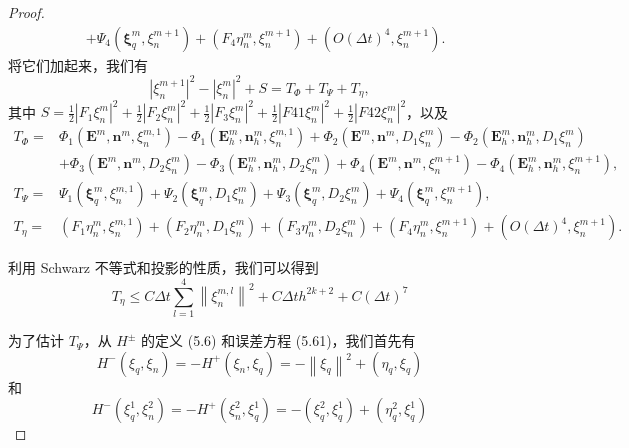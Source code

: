 \begin{proof}
\begin{align}
          & +\Psi_{4}\left(\boldsymbol{\xi}_{q}^{m}, \xi_{n}^{m+1}\right)+\left(F_{4} \eta_{n}^{m}, \xi_{n}^{m+1}\right)+\left(O(\Delta t)^{4}, \xi_{n}^{m+1}\right) .
    \end{align}
    将它们加起来，我们有
    \begin{equation}
        |\xi_n^{m+1}|^2 - |\xi_n^m|^2 + S = T_\Phi + T_\Psi + T_\eta,
    \end{equation}
    其中 $S = \frac{1}{2} |F_1 \xi_n^m|^2 + \frac{1}{2} |F_2 \xi_n^m|^2 + \frac{1}{2} |F_3 \xi_n^m|^2 + \frac{1}{2} |F{41} \xi_n^m|^2 + \frac{1}{2} |F{42} \xi_n^m|^2$，以及
    \begin{align*}
        T_{\Phi}= & \Phi_{1}\left(\boldsymbol{E}^{m}, \boldsymbol{n}^{m}, \xi_{n}^{m, 1}\right)-\Phi_{1}\left(\boldsymbol{E}_{h}^{m}, \boldsymbol{n}_{h}^{m}, \xi_{n}^{m, 1}\right)+\Phi_{2}\left(\boldsymbol{E}^{m}, \boldsymbol{n}^{m}, D_{1} \xi_{n}^{m}\right)-\Phi_{2}\left(\boldsymbol{E}_{h}^{m}, \boldsymbol{n}_{h}^{m}, D_{1} \xi_{n}^{m}\right) \\
                  & +\Phi_{3}\left(\boldsymbol{E}^{m}, \boldsymbol{n}^{m}, D_{2} \xi_{n}^{m}\right)-\Phi_{3}\left(\boldsymbol{E}_{h}^{m}, \boldsymbol{n}_{h}^{m}, D_{2} \xi_{n}^{m}\right)+\Phi_{4}\left(\boldsymbol{E}^{m}, \boldsymbol{n}^{m}, \xi_{n}^{m+1}\right)-\Phi_{4}\left(\boldsymbol{E}_{h}^{m}, \boldsymbol{n}_{h}^{m}, \xi_{n}^{m+1}\right), \\
        T_{\Psi}= & \Psi_{1}\left(\boldsymbol{\xi}_{q}^{m}, \xi_{n}^{m, 1}\right)+\Psi_{2}\left(\boldsymbol{\xi}_{q}^{m}, D_{1} \xi_{n}^{m}\right)+\Psi_{3}\left(\boldsymbol{\xi}_{q}^{m}, D_{2} \xi_{n}^{m}\right)+\Psi_{4}\left(\boldsymbol{\xi}_{q}^{m}, \xi_{n}^{m+1}\right),                                                                         \\
        T_{\eta}= & \left(F_{1} \eta_{n}^{m}, \xi_{n}^{m, 1}\right)+\left(F_{2} \eta_{n}^{m}, D_{1} \xi_{n}^{m}\right)+\left(F_{3} \eta_{n}^{m}, D_{2} \xi_{n}^{m}\right)+\left(F_{4} \eta_{n}^{m}, \xi_{n}^{m+1}\right)+\left(O(\Delta t)^{4}, \xi_{n}^{m+1}\right) .
    \end{align*}

    利用 Schwarz 不等式和投影的性质，我们可以得到
    \begin{equation}
        T_{\eta} \leq C \Delta t \sum_{l=1}^{4}\left\|\xi_{n}^{m, l}\right\|^{2}+C \Delta t h^{2 k+2}+C(\Delta t)^{7}
    \end{equation}

    为了估计 $T_\Psi$，从 $H^{\pm}$ 的定义 (5.6) 和误差方程 (5.61)，我们首先有 $$
        H^{-}\left(\xi_{q}, \xi_{n}\right)=-H^{+}\left(\xi_{n}, \xi_{q}\right)=-\left\|\xi_{q}\right\|^{2}+\left(\eta_{q}, \xi_{q}\right)
    $$
    和
    $$
        H^{-}\left(\xi_{q}^{1}, \xi_{n}^{2}\right)=-H^{+}\left(\xi_{n}^{2}, \xi_{q}^{1}\right)=-\left(\xi_{q}^{2}, \xi_{q}^{1}\right)+\left(\eta_{q}^{2}, \xi_{q}^{1}\right)
    $$


\end{proof}

